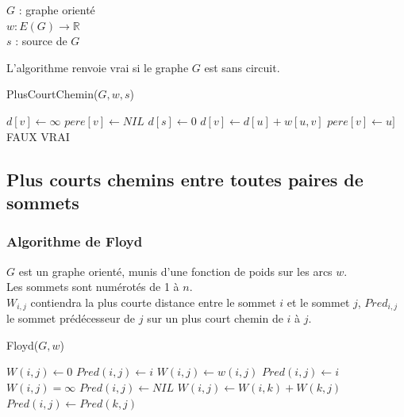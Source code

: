 \documentclass[11pt,a4paper]{report}
\begin{document}
\noindent
$G$ : graphe orienté\\
$w: E(G) \rightarrow \mathbb{R}$ \\ 
$s$ : source de $G$

L'algorithme renvoie vrai si le graphe $G$ est sans circuit.

\begin{algorithm}
\caption{PlusCourtChemin($G, w, s$)}
\begin{algorithmic}[1]
\STATE $d[v] \leftarrow \infty$
\STATE $pere[v] \leftarrow NIL$
\ENDFOR
\STATE $d[s] \leftarrow 0$ 
\STATE $d[v] \leftarrow d[u] + w[u,v]$
\STATE $pere[v] \leftarrow u]$
\ENDIF
\ENDFOR
\ENDFOR
{} 
\RETURN FAUX
\ENDIF
\ENDFOR
\RETURN VRAI
\end{algorithmic}
\end{algorithm}

\subsection{Plus courts chemins entre toutes paires de sommets}

\subsubsection{Algorithme de Floyd}

\noindent
$G$ est un graphe orienté, munis d'une fonction de poids sur les arcs $w$.\\
Les sommets sont numérotés de 1 à $n$. \\
 $W_{i,j}$ contiendra la plus courte distance entre le sommet $i$ et le sommet $j$, $Pred_{i,j}$ le sommet prédécesseur de $j$ sur un plus court chemin de $i$ à $j$.

\begin{algorithm}
\caption{Floyd($G, w$)}
\begin{algorithmic}[1]
\STATE $W(i,j) \leftarrow  0$
\STATE $Pred(i,j) \leftarrow  i$
\STATE $W(i,j) \leftarrow  w(i,j)$
\STATE $Pred(i,j) \leftarrow  i$
\ELSE  
\STATE $W(i,j) = \infty$
\STATE $Pred(i,j) \leftarrow  NIL$
\ENDIF
\ENDFOR
\ENDFOR
{}
\STATE $W(i,j) \leftarrow W(i,k) + W(k,j)$
\STATE $Pred(i,j) \leftarrow  Pred(k,j)$
\ENDIF
\ENDFOR
\ENDFOR
\ENDFOR
\end{algorithmic}
\end{algorithm}
\end{document}
